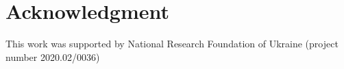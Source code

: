 \documentclass[a4paper,fleqn]{cas-sc}
\begin{document}
\printcredits

\section*{Acknowledgment}

This work was supported by National Research Foundation  of Ukraine
(project number 2020.02/0036)

%
%






%
%
\end{document}
